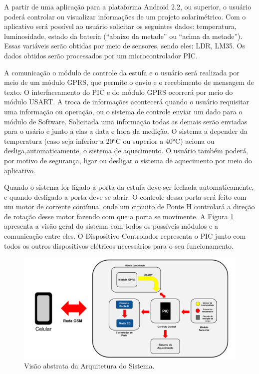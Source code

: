\documentclass{report}
\begin{document}
	A partir de uma aplicação para a plataforma Android 2.2, ou superior, o usuário poderá controlar ou visualizar informações de um projeto solarimétrico. Com o aplicativo
	será possível ao usuário solicitar os seguintes dados: temperatura, luminosidade, estado da bateria (“abaixo da metade” ou “acima da metade”). Essas variáveis serão obtidas 
	por meio de sensores, sendo eles: LDR, LM35. Os dados obtidos serão processados por um microcontrolador PIC. 

	A comunicação o módulo de controle da estufa e o usuário será realizada por meio de um módulo GPRS, que permite o envio e o recebimento de mensagem de texto. O interfaceamento 
	do PIC e do módulo GPRS ocorrerá por meio do módulo USART. A troca de informações acontecerá quando o usuário requisitar uma informação ou operação, ou o sistema de controle enviar 
	um dado para o módulo de Software. Solicitada uma informação todas as demais serão enviadas para o usário e junto a elas a data e hora da medição. O sistema a depender da temperatura (caso seja inferior a 20°C
	ou superior a 40°C) aciona ou desliga,automaticamente, o sistema de aquecimento. O usuário também poderá, por motivo de segurança, ligar ou desligar o sistema de aquecimento por meio 
	do aplicativo. 
	
	Quando o sistema for ligado a porta da estufa deve ser fechada automaticamente, e quando desligado a porta deve se abrir. O controle dessa porta será feito com um motor de corrente 
	contínua, onde um circuito de Ponte H controlará a direção de rotação desse motor fazendo com que a porta se movimente. A Figura \ref{figure:arquiteturaGeral} apresenta a visão geral
	do sistema com todos os possíveis módulos e a comunicação entre eles. O Dispositivo Controlador representa o PIC junto com todos os outros dispositivos elétricos necessários para o 
	seu funcionamento.
	
	\begin{figure}[H]
	 \includegraphics[width=\linewidth]{pictures/visao_geral.png}
	 \caption{Visão abstrata da Arquitetura do Sistema.}
	 \label{figure:arquiteturaGeral}
	\end{figure}
\end{document}

